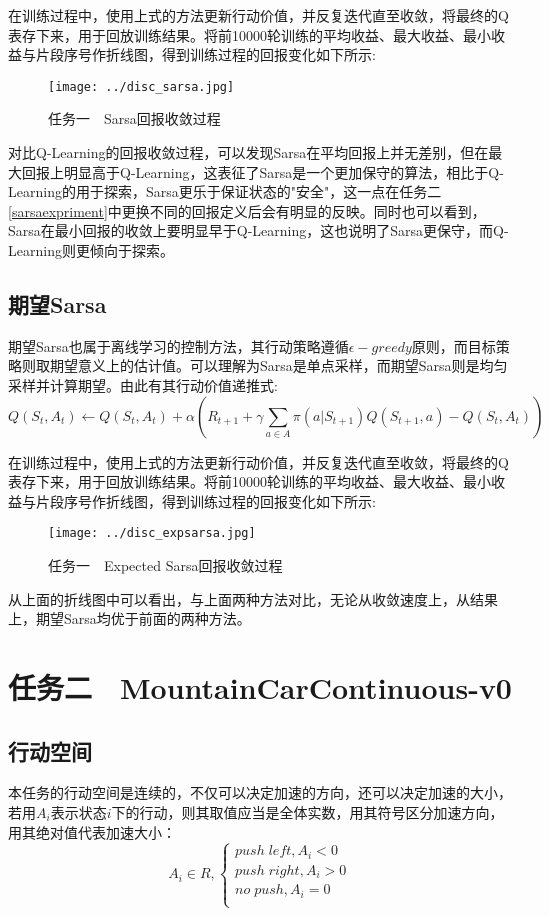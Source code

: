 \documentclass[UTF8]{ctexart}
\begin{document}
在训练过程中，使用上式的方法更新行动价值，并反复迭代直至收敛，将最终的Q表存下来，用于回放训练结果。将前10000轮训练的平均收益、最大收益、最小收益与片段序号作折线图，得到训练过程的回报变化如下所示:
\begin{figure}[H]
    \centering
    \texttt{[image: ../disc\_sarsa.jpg]}
    \caption{任务一　Sarsa回报收敛过程}
\end{figure}
对比Q-Learning的回报收敛过程，可以发现Sarsa在平均回报上并无差别，但在最大回报上明显高于Q-Learning，这表征了Sarsa是一个更加保守的算法，相比于Q-Learning的用于探索，Sarsa更乐于保证状态的"安全"，这一点在任务二\ref{sarsaexpriment}中更换不同的回报定义后会有明显的反映。同时也可以看到，Sarsa在最小回报的收敛上要明显早于Q-Learning，这也说明了Sarsa更保守，而Q-Learning则更倾向于探索。

\subsection{期望Sarsa}\label{expsarsa}
期望Sarsa也属于离线学习的控制方法，其行动策略遵循$\epsilon-greedy$原则，而目标策略则取期望意义上的估计值。可以理解为Sarsa是单点采样，而期望Sarsa则是均匀采样并计算期望。由此有其行动价值递推式:
\begin{equation}
    Q(S_t,A_t)\leftarrow Q(S_t,A_t) + \alpha(R_{t+1}+\gamma \sum_{a\in A} \pi(a|S_{t+1}) Q(S_{t+1},a)-Q(S_t,A_t))    
\end{equation}

在训练过程中，使用上式的方法更新行动价值，并反复迭代直至收敛，将最终的Q表存下来，用于回放训练结果。将前10000轮训练的平均收益、最大收益、最小收益与片段序号作折线图，得到训练过程的回报变化如下所示:
\begin{figure}[H]
    \centering
    \texttt{[image: ../disc\_expsarsa.jpg]}
    \caption{任务一　Expected Sarsa回报收敛过程}
\end{figure}

从上面的折线图中可以看出，与上面两种方法对比，无论从收敛速度上，从结果上，期望Sarsa均优于前面的两种方法。

\section{任务二　MountainCarContinuous-v0}
\subsection{行动空间}
本任务的行动空间是连续的，不仅可以决定加速的方向，还可以决定加速的大小，若用$A_i$表示状态$i$下的行动，则其取值应当是全体实数，用其符号区分加速方向，用其绝对值代表加速大小：
\begin{equation}
    A_i \in R,\begin{cases}
        push \; left , A_i<0\\
        push \; right, A_i > 0\\
        no \; push, A_i = 0\\
    \end{cases}
\end{equation}
\end{document}
